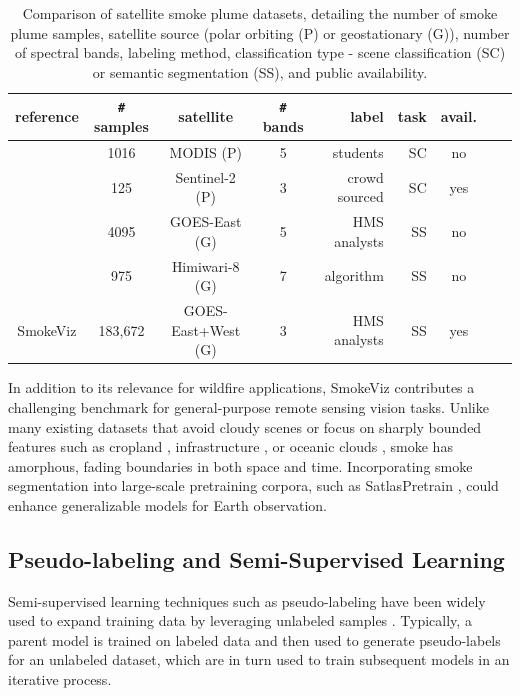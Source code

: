 \documentclass{article}
\begin{document}
\begin{table}[h]
    \caption{Comparison of satellite smoke plume datasets, detailing the number of smoke plume samples, satellite source (polar orbiting (P) or geostationary (G)), number of spectral bands, labeling method, classification type - scene classification (SC) or semantic segmentation (SS), and public availability.}\label{studies}
    \centering
    \begin{tabular}{ccccrrcrc}
        \toprule
        reference & \verb|#| samples & satellite & \verb|#| bands & label & task & avail.\\
        \midrule
        \cite{smokenet}& 1016 & MODIS (P)& 5 & students & SC & no \\
        \cite{satlas} & 125 & Sentinel-2 (P)& 3 & crowd sourced & SC & yes \\
        \cite{smoke_goes}& 4095 & GOES-East (G)& 5 & HMS analysts & SS & no \\
        \cite{larsen} & 975 & Himiwari-8 (G) & 7 & algorithm& SS & no \\
        SmokeViz  & 183,672 & GOES-East+West (G)& 3 & HMS analysts & SS & yes \\
        \bottomrule
    \end{tabular}
\end{table}

In addition to its relevance for wildfire applications, SmokeViz contributes a challenging benchmark for general-purpose remote sensing vision tasks. Unlike many existing datasets that avoid cloudy scenes \cite{bigearthnet, crops} or focus on sharply bounded features such as cropland \cite{crops}, infrastructure \cite{polyworld}, or oceanic clouds \cite{cyclone, cloud_texture}, smoke has amorphous, fading boundaries in both space and time. Incorporating smoke segmentation into large-scale pretraining corpora, such as SatlasPretrain \cite{satlas}, could enhance generalizable models for Earth observation.

\subsection{Pseudo-labeling and Semi-Supervised Learning}

Semi-supervised learning techniques such as pseudo-labeling have been widely used to expand training data by leveraging unlabeled samples \cite{pseudo}. Typically, a parent model is trained on labeled data and then used to generate pseudo-labels for an unlabeled dataset, which are in turn used to train subsequent models in an iterative process.
\end{document}
